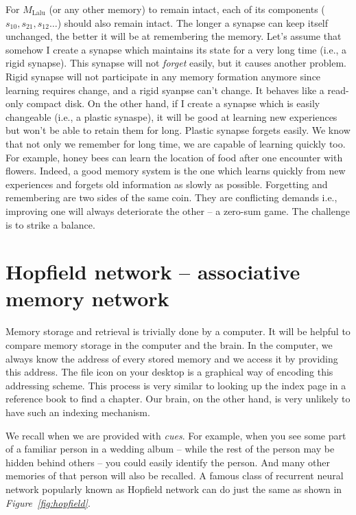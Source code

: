 \documentclass[]{resonance}
\newcommand\Fig[1]{\textit{Figure~\ref{#1}}}
\begin{document}
For $M_\text{Lalu}$ (or any other memory) to remain intact, each of its
components ($s_{10}, s_{21}, s_{12} \ldots$) should also remain intact.  The
longer a synapse can keep itself unchanged, the better it will be at remembering
the memory. Let's assume that somehow I create a synapse which maintains its
state for a very long time (i.e., a rigid synapse). This synapse will not
\emph{forget} easily, but it causes another problem. Rigid synapse will not
participate in any memory formation anymore since learning requires change, and
a rigid syanpse can't change. It behaves like a read-only compact disk. On the other hand, if
I create a synapse which is easily changeable (i.e., a plastic synaspe), it will
be good at learning new experiences but won't be able to retain them for long.
Plastic synapse forgets easily.  We know that not only we remember for long
time, we are capable of learning quickly too. For example, honey bees can learn
the location of food after one encounter with flowers.  Indeed, a good memory
system is the one which learns quickly from new experiences and forgets old
information as slowly as possible.  Forgetting and remembering are two sides of
the same coin.  They are conflicting demands i.e., improving one will always
deteriorate the other -- a zero-sum game.  The challenge is to strike a balance. 

\section{Hopfield network -- associative memory network}\label{sec:hopfield}

Memory storage and retrieval is trivially done by a computer. It will be helpful
to compare memory storage in the computer and the brain. In the computer, we
always know the address of every stored memory and we access it by providing
this address. The file icon on your desktop is a graphical way of encoding this
addressing scheme. This process is very similar to looking up the index page in
a reference book to find a chapter. Our brain, on the other hand, is very
unlikely to have such an indexing mechanism. 

We recall when we are provided with \textit{cues}. For example, when you see
some part of a familiar person in a wedding album -- while the rest of the
person may be hidden behind others -- you could easily identify the person. And
many other memories of that person will also be recalled. A famous class of
recurrent neural network popularly known as Hopfield network can do just the
same as shown in \Fig{fig:hopfield}.
\end{document}
